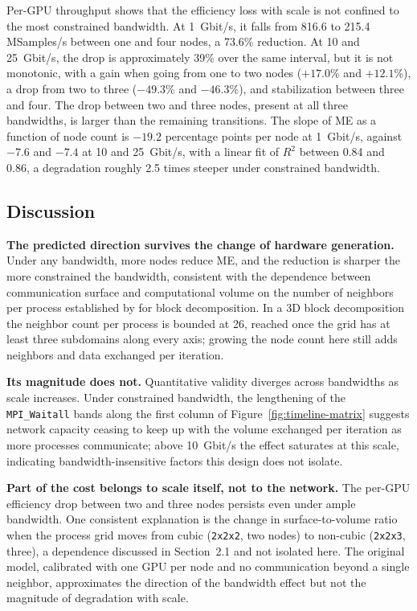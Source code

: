 \documentclass[12pt]{article}
\begin{document}
Per-GPU throughput shows that the efficiency loss with scale is not confined to the most constrained bandwidth. At 1~Gbit/s, it falls from 816.6 to 215.4 MSamples/s between one and four nodes, a 73.6\% reduction. At 10 and 25~Gbit/s, the drop is approximately 39\% over the same interval, but it is not monotonic, with a gain when going from one to two nodes ($+17.0$\% and $+12.1$\%), a drop from two to three ($-49.3$\% and $-46.3$\%), and stabilization between three and four. The drop between two and three nodes, present at all three bandwidths, is larger than the remaining transitions. The slope of ME as a function of node count is $-19.2$ percentage points per node at 1~Gbit/s, against $-7.6$ and $-7.4$ at 10 and 25~Gbit/s, with a linear fit of $R^2$ between 0.84 and 0.86, a degradation roughly 2.5 times steeper under constrained bandwidth.

\subsection{Discussion}

\textbf{The predicted direction survives the change of hardware generation.} Under any bandwidth, more nodes reduce ME, and the reduction is sharper the more constrained the bandwidth, consistent with the dependence between communication surface and computational volume on the number of neighbors per process established by \cite{spadotto2026tcc} for block decomposition. In a 3D block decomposition the neighbor count per process is bounded at 26, reached once the grid has at least three subdomains along every axis; growing the node count here still adds neighbors and data exchanged per iteration.

\textbf{Its magnitude does not.} Quantitative validity diverges across bandwidths as scale increases. Under constrained bandwidth, the lengthening of the \texttt{MPI\_Waitall} bands along the first column of Figure~\ref{fig:timeline-matrix} suggests network capacity ceasing to keep up with the volume exchanged per iteration as more processes communicate; above 10~Gbit/s the effect saturates at this scale, indicating bandwidth-insensitive factors this design does not isolate.

\textbf{Part of the cost belongs to scale itself, not to the network.} The per-GPU efficiency drop between two and three nodes persists even under ample bandwidth. One consistent explanation is the change in surface-to-volume ratio when the process grid moves from cubic (\texttt{2x2x2}, two nodes) to non-cubic (\texttt{2x2x3}, three), a dependence discussed in Section~2.1 and not isolated here. The original model, calibrated with one GPU per node and no communication beyond a single neighbor, approximates the direction of the bandwidth effect but not the magnitude of degradation with scale.
\end{document}

